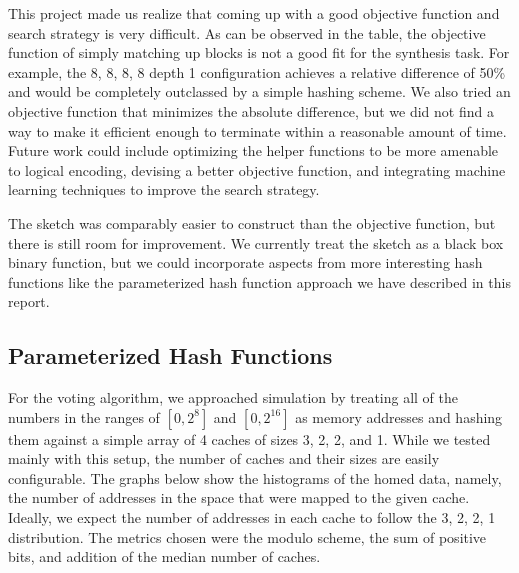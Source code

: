 This project made us realize that coming up with a good objective function and
search strategy is very difficult. As can be observed in the table, the
objective function of simply matching up blocks is not a good fit for the
synthesis task. For example, the 8, 8, 8, 8 depth 1 configuration achieves a
relative difference of 50\% and would be completely outclassed by a simple
hashing scheme. We also tried an objective function that minimizes the absolute
difference, but we did not find a way to make it efficient enough to terminate
within a reasonable amount of time. Future work could include optimizing the
helper functions to be more amenable to logical encoding, devising a better
objective function, and integrating machine learning techniques to improve the
search strategy.

The sketch was comparably easier to construct than the objective function, but
there is still room for improvement. We currently treat the sketch as a black
box binary function, but we could incorporate aspects from more interesting hash
functions like the parameterized hash function approach we have described in
this report.

\subsection{Parameterized Hash Functions}

For the voting algorithm, we approached simulation by treating all of the
numbers in the ranges of $[0, 2^{8}]$ and $[0, 2^{16}]$ as memory addresses and
hashing them against a simple array of 4 caches of sizes 3, 2, 2, and 1.  While
we tested mainly with this setup, the number of caches and their sizes are
easily configurable.  The graphs below show the histograms of the homed data,
namely, the number of addresses in the space that were mapped to the given
cache.  Ideally, we expect the number of addresses in each cache to follow the
3, 2, 2, 1 distribution.  The metrics chosen were the modulo scheme, the sum of
positive bits, and addition of the median number of caches.

